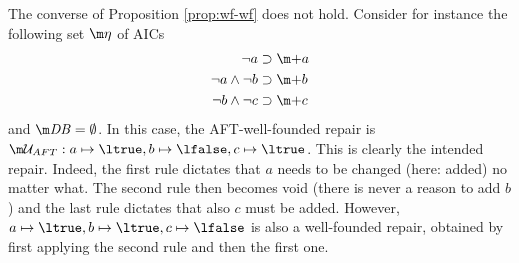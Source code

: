 \begin{example}\label{ex:wf:wf}The converse of Proposition \ref{prop:wf-wf} does
not hold. Consider for instance the following set $\aics$ of AICs 
   \begin{align*}
  \lnot a &\aicrule \add a \\
  \lnot a\land \lnot b &\aicrule \add b\\
  \lnot b \land \lnot c &\aicrule \add  c
 \end{align*}
 and $\db=\emptyset$.
 In this case, the AFT-well-founded repair is $\UU_{AFT}: a \mapsto \ltrue, b\mapsto \lfalse, c\mapsto \ltrue$. This is clearly the intended repair. Indeed, the first rule dictates that $a$ needs to be changed (here: added) no matter what. The second rule then becomes void (there is never a reason to add $b$) and the last rule dictates that also $c$ must be added. 
 However, $a \mapsto \ltrue, b\mapsto \ltrue, c\mapsto \lfalse$ is also a well-founded repair, obtained by first applying the second rule and then the first one.
\end{example}

% 
% 

